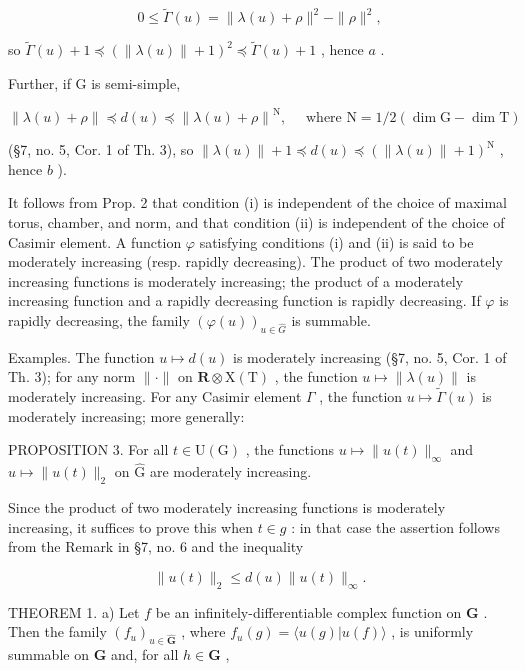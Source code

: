 \[
0 \leq \tilde {\Gamma} (u) = \| \lambda (u) + \rho \| ^ {2} - \| \rho \| ^ {2},
\]

so \(\tilde{\Gamma}(u) + 1 \preccurlyeq (\|\lambda(u)\| + 1)^2 \preccurlyeq \tilde{\Gamma}(u) + 1\) , hence \(a\) .

Further, if G is semi-simple,

\[
\left\| \lambda (u) + \rho \right\| \preccurlyeq d (u) \preccurlyeq \left\| \lambda (u) + \rho \right\| ^ {\mathrm{N}}, \quad \text { where } \mathrm{N} = 1 / 2 (\dim \mathrm{G} - \dim \mathrm{T})
\]

(§7, no. 5, Cor. 1 of Th. 3), so \(\| \lambda(u) \| + 1 \preccurlyeq d(u) \preccurlyeq (\| \lambda(u) \| + 1)^{\mathrm{N}}\) , hence \(b\) ).

It follows from Prop. 2 that condition (i) is independent of the choice of maximal torus, chamber, and norm, and that condition (ii) is independent of the choice of Casimir element. A function \(\varphi\) satisfying conditions (i) and (ii) is said to be moderately increasing (resp. rapidly decreasing). The product of two moderately increasing functions is moderately increasing; the product of a moderately increasing function and a rapidly decreasing function is rapidly decreasing. If \(\varphi\) is rapidly decreasing, the family \((\varphi(u))_{u\in\hat{G}}\) is summable.

Examples. The function \(u \mapsto d(u)\) is moderately increasing (§7, no. 5, Cor. 1 of Th. 3); for any norm \(\| \cdot \|\) on \(\mathbf{R} \otimes \mathrm{X(T)}\) , the function \(u \mapsto \| \lambda(u) \|\) is moderately increasing. For any Casimir element \(\Gamma\) , the function \(u \mapsto \tilde{\Gamma}(u)\) is moderately increasing; more generally:

PROPOSITION 3. For all \(t \in \mathrm{U}(\mathrm{G})\) , the functions \(u \mapsto \| u(t) \|_{\infty}\) and \(u \mapsto \| u(t) \|_2\) on \(\hat{\mathrm{G}}\) are moderately increasing.

Since the product of two moderately increasing functions is moderately increasing, it suffices to prove this when \(t \in g\) : in that case the assertion follows from the Remark in §7, no. 6 and the inequality

\[
\| u (t) \| _ {2} \leq d (u) \| u (t) \| _ {\infty}.
\]

THEOREM 1. a) Let \(f\) be an infinitely-differentiable complex function on \(\mathbf{G}\) . Then the family \((f_u)_{u\in \hat{\mathbf{G}}}\) , where \(f_{u}(g) = \langle u(g)|u(f)\rangle\) , is uniformly summable on \(\mathbf{G}\) and, for all \(h\in \mathbf{G}\) ,

